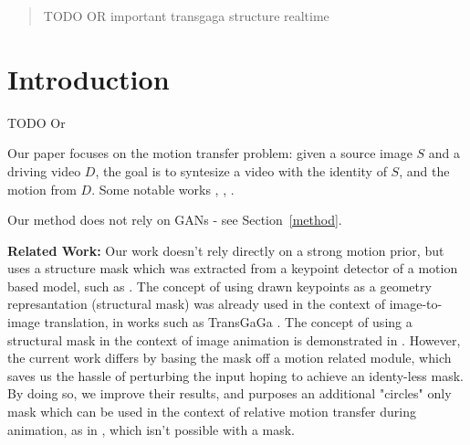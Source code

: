 \documentclass{article}
\begin{document}
\printAffiliationsAndNotice{}  %

\begin{abstract}
TODO OR
important
transgaga structure
realtime
\cite{siarohin2020order}
\end{abstract}

\section{Introduction}
TODO Or

Our paper focuses on the motion transfer problem: given a source image $S$
and a driving video $D$, the goal is to syntesize a video with the identity
of $S$, and the motion from $D$.
Some notable works \cite{siarohin2020order}, \cite{wiles2018x2face},
\cite{siarohin2019animating}.

Our method does not rely on GANs - see Section~\ref{method}.

\medskip

\textbf{Related Work:} Our work doesn't rely directly on a strong motion prior,
but uses a structure mask which was extracted from a keypoint detector
of a motion based model, such as \cite{siarohin2020order}. The concept of using drawn keypoints as
a geometry represantation (structural mask) was already used in the context
of image-to-image translation, in works such as TransGaGa \cite{wu2019transgaga}.
The concept of using a structural mask in the context of image animation is
demonstrated in \cite{shalev2020image}. However, the current work differs
by basing the mask off a motion related module, which saves us the hassle
of perturbing the input hoping to achieve an identy-less mask. By doing so,
we improve their results, and purposes an additional "circles" only mask
which can be used in the context
of relative motion transfer during animation, as in
\cite{siarohin2020order}, which isn't possible with a mask.
\end{document}
